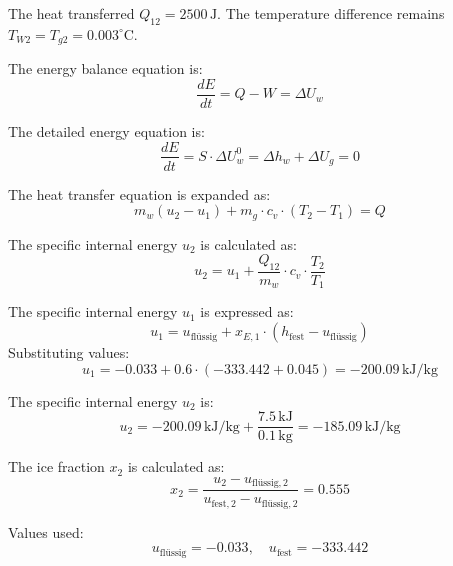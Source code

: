 The heat transferred \( Q_{12} = 2500 \, \text{J} \).  
The temperature difference remains \( T_{W2} = T_{g2} = 0.003^\circ \text{C} \).  

The energy balance equation is:  
\[
\frac{dE}{dt} = Q - W = \Delta U_w
\]  

The detailed energy equation is:  
\[
\frac{dE}{dt} = S \cdot \Delta U_w^0 = \Delta h_w + \Delta U_g = 0
\]  

The heat transfer equation is expanded as:  
\[
m_w (u_2 - u_1) + m_g \cdot c_v \cdot (T_2 - T_1) = Q
\]  

The specific internal energy \( u_2 \) is calculated as:  
\[
u_2 = u_1 + \frac{Q_{12}}{m_w} \cdot c_v \cdot \frac{T_2}{T_1}
\]  

The specific internal energy \( u_1 \) is expressed as:  
\[
u_1 = u_{\text{flüssig}} + x_{E,1} \cdot (h_{\text{fest}} - u_{\text{flüssig}})
\]  
Substituting values:  
\[
u_1 = -0.033 + 0.6 \cdot (-333.442 + 0.045) = -200.09 \, \text{kJ/kg}
\]  

The specific internal energy \( u_2 \) is:  
\[
u_2 = -200.09 \, \text{kJ/kg} + \frac{7.5 \, \text{kJ}}{0.1 \, \text{kg}} = -185.09 \, \text{kJ/kg}
\]  

The ice fraction \( x_2 \) is calculated as:  
\[
x_2 = \frac{u_2 - u_{\text{flüssig},2}}{u_{\text{fest},2} - u_{\text{flüssig},2}} = 0.555
\]  

Values used:  
\[
u_{\text{flüssig}} = -0.033, \quad u_{\text{fest}} = -333.442
\]